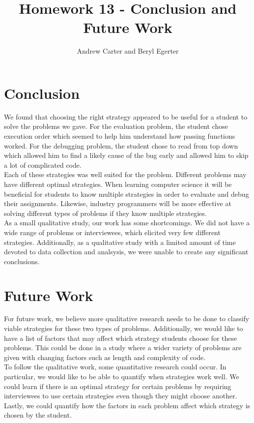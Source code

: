 \documentclass{article}
\title{Homework 13 - Conclusion and Future Work}
\author{Andrew Carter and Beryl Egerter}
\begin{document}
\maketitle
\section{Conclusion}

We found that choosing the right strategy appeared to be useful for a student to solve the problems we gave. 
For the evaluation problem, the student chose execution order which seemed to help him understand how passing functions worked. 
For the debugging problem, the student chose to read from top down which allowed him to find a likely cause of the bug early and allowed him to skip a lot of complicated code.  \\

Each of these strategies was well suited for the problem. 
Different problems may have different optimal strategies. 
When learning computer science it will be beneficial for students to know multiple strategies in order to evaluate and debug their assignments. Likewise, industry programmers will be more effective at solving different types of problems if they know multiple strategies. \\

As a small qualitative study, our work has some shortcomings. We did not have a wide range of problems or interviewees, which elicited very few different strategies. Additionally, as a qualitative study with a limited amount of time devoted to data collection and analsysis, we were unable to create any significant conclusions. 

\section{Future Work}



For future work, we believe more qualitative research needs to be done to classify viable strategies for these two types of problems. 
Additionally, we would like to have a list of factors that may affect which strategy students choose for these problems. 
This could be done in a study where a wider variety of problems are given with changing factors such as length and complexity of code. 
\\

To follow the qualitative work, some quantitative research could occur. 
In particular, we would like to be able to quantify when strategies work well. 
We could learn if there is an optimal strategy for certain problems by requiring interviewees to use certain strategies even though they might choose another. 
Lastly, we could quantify how the factors in each problem affect which strategy is chosen by the student. 
\end{document}
